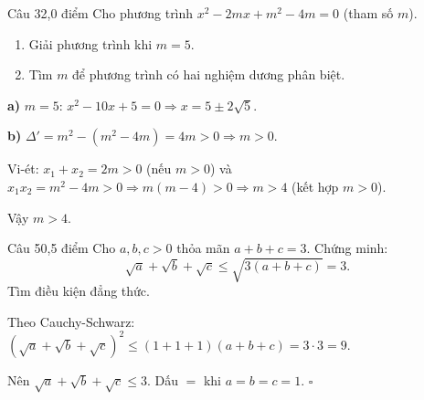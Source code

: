 \begin{de_cau}{Câu 3}{2,0 điểm}
Cho phương trình $x^2-2mx+m^2-4m=0$ (tham số $m$).
\begin{enumerate}[label=\alph*)]
  \item Giải phương trình khi $m=5$.
  \item Tìm $m$ để phương trình có hai nghiệm dương phân biệt.
\end{enumerate}
\end{de_cau}

\begin{loi_giai_cau}
\textbf{a)} $m=5$: $x^2-10x+5=0\Rightarrow x=5\pm2\sqrt{5}$.

\textbf{b)} $\Delta'=m^2-(m^2-4m)=4m>0\Rightarrow m>0$.

Vi-ét: $x_1+x_2=2m>0$ (\checkmark  nếu $m>0$) và $x_1x_2=m^2-4m>0\Rightarrow m(m-4)>0\Rightarrow m>4$ (kết hợp $m>0$).

Vậy $\boxed{m>4}$.
\end{loi_giai_cau}

\begin{de_cau}{Câu 5}{0,5 điểm}
Cho $a, b, c > 0$ thỏa mãn $a + b + c = 3$. Chứng minh:
\[\sqrt{a} + \sqrt{b} + \sqrt{c} \le \sqrt{3(a+b+c)} = 3.\]
Tìm điều kiện đẳng thức.
\end{de_cau}

\begin{loi_giai_cau}
Theo Cauchy-Schwarz: $(\sqrt{a}+\sqrt{b}+\sqrt{c})^2\le(1+1+1)(a+b+c)=3\cdot3=9$.

Nên $\sqrt{a}+\sqrt{b}+\sqrt{c}\le3$. Dấu $=$ khi $a=b=c=1$. $\square$
\end{loi_giai_cau}
